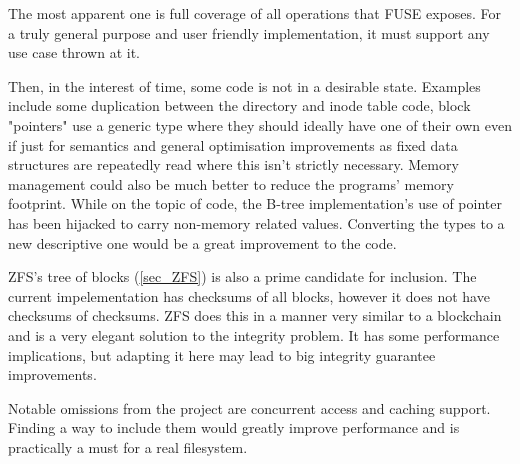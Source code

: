         The most apparent one is full coverage of all operations that FUSE
        exposes. For a truly general purpose and user friendly implementation,
        it must support any use case thrown at it.

        Then, in the interest of time, some code is not in a desirable state.
        Examples include some duplication between the directory and inode table
        code, block "pointers" use a generic type where they should ideally
        have one of their own even if just for semantics and general
        optimisation improvements as fixed data structures are repeatedly read
        where this isn't strictly necessary. Memory management could also be
        much better to reduce the programs' memory footprint. While on the
        topic of code, the B-tree implementation's use of pointer has been
        hijacked to carry non-memory related values. Converting the types to a
        new descriptive one would be a great improvement to the code.

        ZFS's tree of blocks (\ref{sec_ZFS}) is also a prime candidate for
        inclusion. The current impelementation has checksums of all blocks,
        however it does not have checksums of checksums. ZFS does this in a
        manner very similar to a blockchain and is a very elegant solution to
        the integrity problem. It has some performance implications, but
        adapting it here may lead to big integrity guarantee improvements.

        Notable omissions from the project are concurrent access and caching
        support. Finding a way to include them would greatly improve
        performance and is practically a must for a real filesystem.
